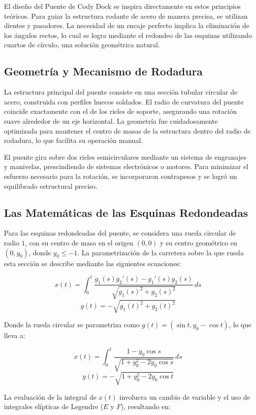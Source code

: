 \documentclass{IEEEtran}
\begin{document}
El diseño del Puente de Cody Dock se inspira directamente en estos principios teóricos. Para guiar la estructura rodante de acero de manera precisa, se utilizan dientes y pasadores. La necesidad de un encaje perfecto implica la eliminación de los ángulos rectos, lo cual se logra mediante el redondeo de las esquinas utilizando cuartos de círculo, una solución geométrica natural.

\subsection{Geometría y Mecanismo de Rodadura}

La estructura principal del puente consiste en una sección tubular circular de acero, construida con perfiles huecos soldados. El radio de curvatura del puente coincide exactamente con el de los rieles de soporte, asegurando una rotación suave alrededor de un eje horizontal. La geometría fue cuidadosamente optimizada para mantener el centro de masas de la estructura dentro del radio de rodadura, lo que facilita su operación manual.

El puente gira sobre dos rieles semicirculares mediante un sistema de engranajes y manivelas, prescindiendo de sistemas electrónicos o motores. Para minimizar el esfuerzo necesario para la rotación, se incorporaron contrapesos y se logró un equilibrado estructural preciso.

\subsection{Las Matemáticas de las Esquinas Redondeadas}

Para las esquinas redondeadas del puente, se considera una rueda circular de radio $1$, con su centro de masa en el origen $(0, 0)$ y su centro geométrico en $(0, y_0)$, donde $y_0 \leq -1$. La parametrización de la carretera sobre la que rueda esta sección se describe mediante las siguientes ecuaciones:

\[ x(t) = \int_{0}^{t}{\frac{g_1(s) g_2'(s) - g_1'(s) g_2(s)}{\sqrt{g_1(s)^2 + g_2(s)^2}}} \, ds \]
\[ y(t) = - \sqrt{g_1(t)^2 + g_2(t)^2} \]

Donde la rueda circular se parametriza como $g(t) = (\sin t, y_0 - \cos t)$, lo que lleva a:

\[ x(t) = \int_{0}^{t}\frac{1 - y_0 \cos s}{\sqrt{1 + y_0^2 - 2 y_0 \cos s}} \, ds \]
\[ y(t) = - \sqrt{1 + y_0^2 - 2 y_0 \cos t} \]

La evaluación de la integral de $x(t)$ involucra un cambio de variable y el uso de integrales elípticas de Legendre ($E$ y $F$), resultando en:
\end{document}
